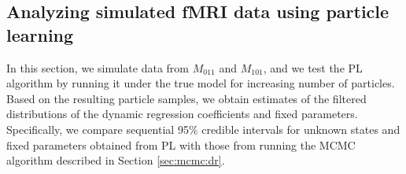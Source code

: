 %
%

\subsection{Analyzing simulated fMRI data using particle learning \label{sec:fmri:sim}}

In this section, we simulate data from $M_{011}$ and $M_{101}$, and we test the PL algorithm by running it under the true model for increasing number of particles. Based on the resulting particle samples, we obtain estimates of the filtered distributions of the dynamic regression coefficients and fixed parameters. Specifically, we compare sequential 95\% credible intervals for unknown states and fixed parameters obtained from PL with those from running the MCMC algorithm described in Section \ref{sec:mcmc:dr}.

